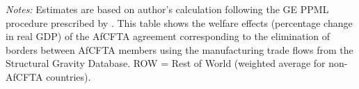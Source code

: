 \vspace{-2.3756cm}

\begin{flushleft}
	\begin{minipage}{1.05\textwidth}
		\scriptsize
		\justifying
		\noindent \textit{Notes:} Estimates are based on author's calculation following the GE PPML procedure prescribed by \citet{anderson2018geppml}. This table shows the welfare effects (percentage change in real GDP) of the AfCFTA agreement corresponding to the elimination of borders between AfCFTA members using the manufacturing trade flows from the Structural Gravity Database. ROW = Rest of World (weighted average for non-AfCFTA countries).
	\end{minipage}
\end{flushleft}